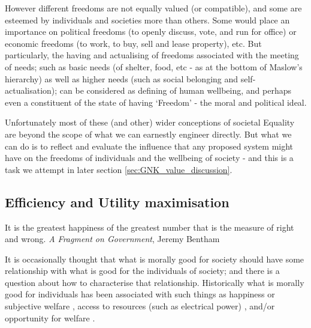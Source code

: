 However different freedoms are not equally valued (or compatible), and some are esteemed by individuals and societies more than others.
Some would place an importance on political freedoms (to openly discuss, vote, and run for office) or economic freedoms (to work, to buy, sell and lease property), etc. %
But particularly, the having and actualising of freedoms associated with the meeting of needs; such as basic needs (of shelter, food, etc - as at the bottom of Maslow's hierarchy) as well as higher needs (such as social belonging and self-actualisation); can be considered as defining of human wellbeing, and perhaps even a constituent of the state of having `Freedom' - the moral and political ideal.

Unfortunately most of these (and other) wider conceptions of societal Equality are beyond the scope of what we can earnestly engineer directly. But what we can do is to reflect and evaluate the influence that any proposed system might have on the freedoms of individuals and the wellbeing of society - and this is a task we attempt in later section \ref{sec:GNK_value_discussion}.

\subsection{Efficiency and Utility maximisation}\label{sec:philosophy_efficiency}


\begin{displayquote}It is the greatest happiness of the greatest number that is the measure of right and wrong. \textit{A Fragment on Government}, Jeremy Bentham\cite{bentham2001fragment}
\end{displayquote} 

It is occasionally thought that what is morally good for society should have some relationship with what is good for the individuals of society; and there is a question about how to characterise that relationship.
Historically what is morally good for individuals has been associated with such things as happiness \cite{burns2005happiness} or subjective welfare \cite{10.2307/2264894}, access to resources (such as electrical power) \cite{10.2307/2265047}, and/or opportunity for welfare \cite{10.2307/4320203}.%


